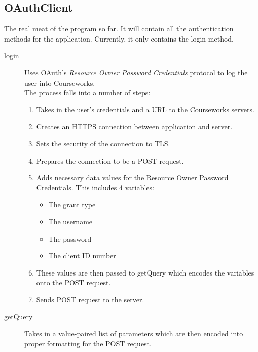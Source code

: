\documentclass{article}
\begin{document}
\subsection{OAuthClient}
The real meat of the program so far. It will contain all the authentication methods for the application. Currently, it only contains the login method.
 \begin{description}
  \item[login] Uses OAuth's \emph{Resource Owner Password Credentials} protocol to log the user into Courseworks. \\
  The process falls into a number of steps:
  \begin{enumerate}
   \item Takes in the user's credentials and a URL to the Courseworks servers.
   \item Creates an HTTPS connection between application and server.
   \item Sets the security of the connection to TLS.
   \item Prepares the connection to be a POST request.
   \item Adds necessary data values for the Resource Owner Password Credentials. This includes 4 variables:
   \begin{itemize}
    \item The grant type
    \item The username
    \item The password
    \item The client ID number
   \end{itemize}
   \item These values are then passed to getQuery which encodes the variables onto the POST request.
   \item Sends POST request to the server.
  \end{enumerate}
  \item[getQuery] Takes in a value-paired list of parameters which are then encoded into proper formatting for the POST request.
 \end{description}
 
\end{document}
